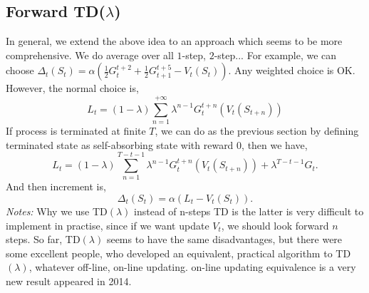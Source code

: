 \documentclass[11pt,a4paper]{article}
\begin{document}
\subsection{Forward TD($\lambda$)}
In general, we extend the above idea to an approach which seems to be more comprehensive. We do average over all $1$-step, $2$-step... For example, we can choose $\Delta_t(S_t) = \alpha(\frac{1}{2}G_t^{t+2} + \frac{1}{2}G_{t+1}^{t+5} - V_t(S_t))$. Any weighted choice is OK. However, the normal choice is,
\begin{equation}
L_t = (1-\lambda)\sum_{n=1}^{+\infty}\lambda^{n-1}G_t^{t+n}(V_t(S_{t+n}))
\end{equation}
If process is terminated at finite $T$, we can do as the previous section by defining terminated state as self-absorbing state with reward $0$, then we have,
\begin{equation}
L_t = (1-\lambda)\sum_{n=1}^{T-t-1}\lambda^{n-1}G_t^{t+n}(V_t(S_{t+n})) + \lambda^{T-t-1}G_t.
\end{equation}
And then increment is,
\begin{equation}
\Delta_t(S_t) = \alpha(L_t - V_t(S_t)).
\end{equation}
\emph{Notes:} Why we use TD$(\lambda)$ instead of n-steps TD is the latter is very difficult to implement in practise, since if we want update $V_t$, we should look forward $n$ steps. So far, TD$(\lambda)$ seems to have the same disadvantages, but there were some excellent people, who developed an equivalent, practical algorithm to TD$(\lambda)$, whatever off-line, on-line updating. on-line updating equivalence is a very new result appeared in 2014.
\end{document}
